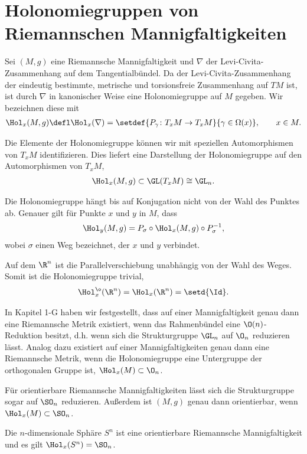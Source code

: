 \documentclass[%
	paper=a5,%
	fleqn,%
	DIV=18,%
	BCOR=0mm,
	fontsize=11pt,
	titlepage=false,%
	bibliography=totoc,
	DIV=18,%
	twoside=true,
	pdftitle=Riemannsche Geometrie,
	pdfauthor=Uwe Semmelmann,
	numbers=noendperiod]%
	{scrbook}
\begin{document}
\section{Holonomiegruppen von Riemannschen Mannigfaltigkeiten}

Sei $(M,g)$ eine Riemannsche Mannigfaltigkeit und $\nabla$ der Levi-Civita-Zusammenhang auf dem Tangentialbündel. Da der Levi-Civita-Zusammenhang der eindeutig bestimmte, metrische und torsionsfreie Zusammenhang auf $TM$ ist, ist durch $\nabla$ in kanonischer Weise eine Holonomiegruppe auf $M$ gegeben. Wir bezeichnen diese mit
\begin{align*}
\Hol_{x}(M,g) \defl \Hol_{x}(\nabla) = 
\setdef{P_{\gamma} \colon T_{x}M\to T_{x}M}{\gamma\in\Omega(x)},\qquad x\in M.
\end{align*}

Die Elemente der Holonomiegruppe können wir mit speziellen Automorphismen von $T_{x}M$ identifizieren. Dies liefert eine Darstellung der Holonomiegruppe auf den Automorphismen von $T_{x}M$,
\begin{align*}
\Hol_{x}(M,g) \subset \GL(T_{x}M) \cong \GL_{n}.
\end{align*}

\begin{rem}
Die Holonomiegruppe hängt bis auf Konjugation nicht von der Wahl des Punktes ab. Genauer gilt für Punkte $x$ und $y$ in $M$, dass
\begin{align*}
\Hol_{y}(M,g) = P_{\sigma}\circ \Hol_{x}(M,g) \circ P_{\sigma}^{-1},
\end{align*}
wobei $\sigma$ einen Weg bezeichnet, der $x$ und $y$ verbindet.\map
\end{rem}

\begin{ex}
\begin{exenum}
 \item Auf dem $\R^n$ ist die Parallelverschiebung unabhängig von der Wahl des Weges. Somit ist die Holonomiegruppe trivial,
 \begin{align*}
\Hol_{x}^\o(\R^n) = \Hol_{x}(\R^n) = \setd{\Id}.
\end{align*}
\item In Kapitel 1-G haben wir festgestellt, dass auf einer Mannigfaltigkeit genau dann eine Riemannsche Metrik existiert, wenn das Rahmenbündel eine $\O(n)$-Reduktion besitzt, d.h. wenn sich die Strukturgruppe $\GL_{n}$ auf $\O_{n}$ reduzieren lässt. Analog dazu existiert auf einer Mannigfaltigkeiten genau dann eine Riemannsche Metrik, wenn die Holonomiegruppe eine Untergruppe der orthogonalen Gruppe ist, $\Hol_{x}(M) \subset \O_{n}$.

Für orientierbare Riemannsche Mannigfaltigkeiten lässt sich die Strukturgruppe sogar auf $\SO_{n}$ reduzieren. Außerdem ist $(M,g)$ genau dann orientierbar, wenn $\Hol_{x}(M)\subset \SO_{n}$.
\item Die $n$-dimensionale Sphäre $S^n$ ist eine orientierbare Riemannsche Mannigfaltigkeit und es gilt $\Hol_{x}(S^n) = \SO_{n}$.\boxc
\end{exenum}
\end{ex}
\end{document}
